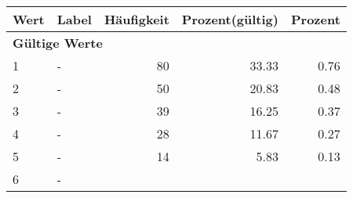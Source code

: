      \begin{longtable}{lXrrr}
     \toprule
     \textbf{Wert} & \textbf{Label} & \textbf{Häufigkeit} & \textbf{Prozent(gültig)} & \textbf{Prozent} \\
     \endhead
     \midrule
     \multicolumn{5}{l}{\textbf{Gültige Werte}}\\

     1 &
     \multicolumn{1}{X}{ -  } &


       \num{80} &
       \num[round-mode=places,round-precision=2]{33.33} &
         \num[round-mode=places,round-precision=2]{0.76} \\

     2 &
     \multicolumn{1}{X}{ -  } &


       \num{50} &
       \num[round-mode=places,round-precision=2]{20.83} &
         \num[round-mode=places,round-precision=2]{0.48} \\

     3 &
     \multicolumn{1}{X}{ -  } &


       \num{39} &
       \num[round-mode=places,round-precision=2]{16.25} &
         \num[round-mode=places,round-precision=2]{0.37} \\

     4 &
     \multicolumn{1}{X}{ -  } &


       \num{28} &
       \num[round-mode=places,round-precision=2]{11.67} &
         \num[round-mode=places,round-precision=2]{0.27} \\

     5 &
     \multicolumn{1}{X}{ -  } &


       \num{14} &
       \num[round-mode=places,round-precision=2]{5.83} &
         \num[round-mode=places,round-precision=2]{0.13} \\

     6 &
     \multicolumn{1}{X}{ -  } &



\end{longtable}
